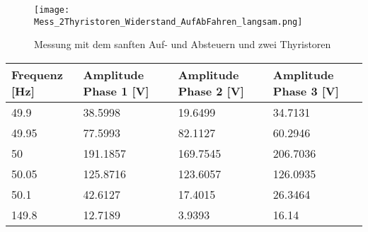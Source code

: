 \begin{figure}[ht!]
	\centering
	\texttt{[image: Mess\_2Thyristoren\_Widerstand\_AufAbFahren\_langsam.png]}	
	\caption{Messung mit dem sanften Auf- und Absteuern und zwei Thyristoren}\label{Mess_2Thyristoren_Widerstand_AufAbFahren_langsam}	
\end{figure}
\newpage
\begin{table}[ht!]
	\centering
	\begin{tabular}{|l|l|l|l|}
		\hline
		Frequenz {[}Hz{]} & Amplitude Phase 1 {[}V{]}                                                           & Amplitude Phase 2 {[}V{]}                                                           & Amplitude Phase 3 {[}V{]}                                                           \\ \hline
		49.9              & 38.5998                                                                             & 19.6499                                                                             & 34.7131                                                                             \\ \hline
		49.95             & 77.5993                                                                             & 82.1127                                                                             & 60.2946                                                                             \\ \hline
		50                & 191.1857                                                                            & 169.7545                                                                            & 206.7036                                                                            \\ \hline
		50.05             & 125.8716                                                                            & 123.6057                                                                            & 126.0935                                                                            \\ \hline
		50.1              & 42.6127                                                                             & 17.4015                                                                             & 26.3464                                                                             \\ \hline
		149.8             & 12.7189                                                                             & 3.9393                                                                              & 16.14                                                                               \\ \hline

\end{tabular}
\end{table}

